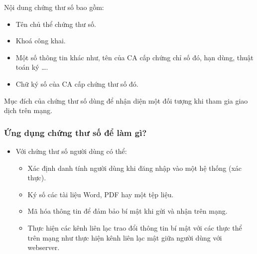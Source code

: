 \documentclass[a4paper,12pt]{report}
\begin{document}
Nội dung chứng thư số bao gồm:
\begin{itemize}
\item Tên chủ thể chứng thư số.
\item Khoá công khai.
\item Một số thông tin khác như, tên của CA cấp chứng chỉ số đó, hạn dùng, thuật toán ký \ldots.
\item Chữ ký số của CA cấp chứng thư số đó.
\end{itemize}

Mục đích của chứng thư số dùng để nhận diện một đối tượng khi tham gia giao dịch trên mạng.

\subsubsection{Ứng dụng chứng thư số để làm gì?}
\begin{itemize}
\item Với chứng thư số người dùng có thể:
\begin{itemize}
\item Xác định danh tính người dùng khi đăng nhập vào một hệ thống (xác thực).
\item Ký số các tài liệu Word, PDF hay một tệp liệu.
\item Mã hóa thông tin để đảm bảo bí mật khi gửi và nhận trên mạng.
\item Thực hiện các kênh liên lạc trao đổi thông tin bí mật với các thực thể trên mạng như thực hiện kênh liên lạc mật giữa người dùng với webserver.
\end{itemize}
\end{itemize}
\end{document}
